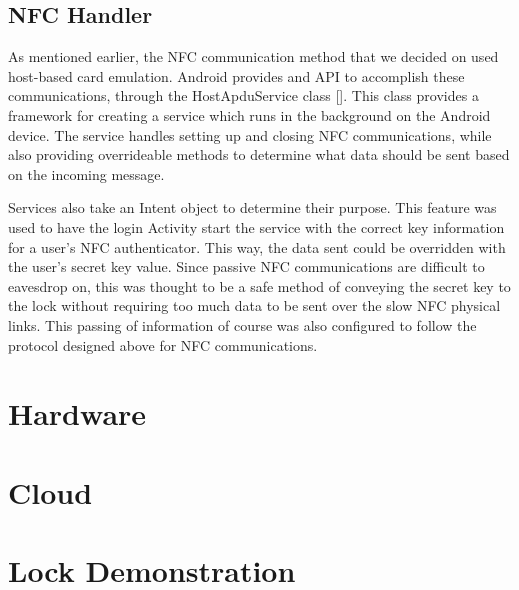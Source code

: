 \documentclass[12pt]{report}
\begin{document}

\subsection{NFC Handler}

As mentioned earlier, the NFC communication method that we decided on used host-based card emulation. Android provides
and API to accomplish these communications, through the HostApduService class []. This class provides a framework for
creating a service which runs in the background on the Android device. The service handles setting up and closing NFC
communications, while also providing overrideable methods to determine what data should be sent based on the incoming
message.

Services also take an Intent object to determine their purpose. This feature was used to have the login Activity start
the service with the correct key information for a user's NFC authenticator. This way, the data sent could be overridden
with the user's secret key value. Since passive NFC communications are difficult to eavesdrop on, this was thought to be
a safe method of conveying the secret key to the lock without requiring too much data to be sent over the slow NFC
physical links. This passing of information of course was also configured to follow the protocol designed above for NFC
communications.


\section{Hardware}


\section{Cloud}


\section{Lock Demonstration}
\end{document}
